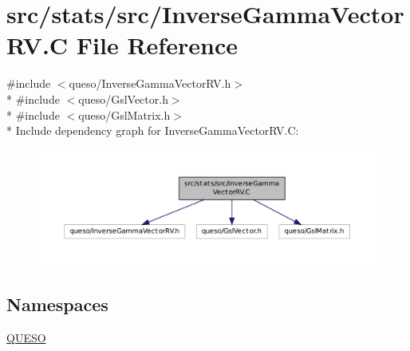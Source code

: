 \hypertarget{_inverse_gamma_vector_r_v_8_c}{\section{src/stats/src/\-Inverse\-Gamma\-Vector\-R\-V.C File Reference}
\label{_inverse_gamma_vector_r_v_8_c}
}
{\ttfamily \#include $<$queso/\-Inverse\-Gamma\-Vector\-R\-V.\-h$>$}\\*
{\ttfamily \#include $<$queso/\-Gsl\-Vector.\-h$>$}\\*
{\ttfamily \#include $<$queso/\-Gsl\-Matrix.\-h$>$}\\*
Include dependency graph for Inverse\-Gamma\-Vector\-R\-V.\-C\-:
\nopagebreak
\begin{figure}[H]
\begin{center}
\leavevmode
\includegraphics[width=350pt]{_inverse_gamma_vector_r_v_8_c__incl}
\end{center}
\end{figure}
\subsection*{Namespaces}
\begin{DoxyCompactItemize}
\item 
\hyperlink{namespace_q_u_e_s_o}{Q\-U\-E\-S\-O}
\end{DoxyCompactItemize}
